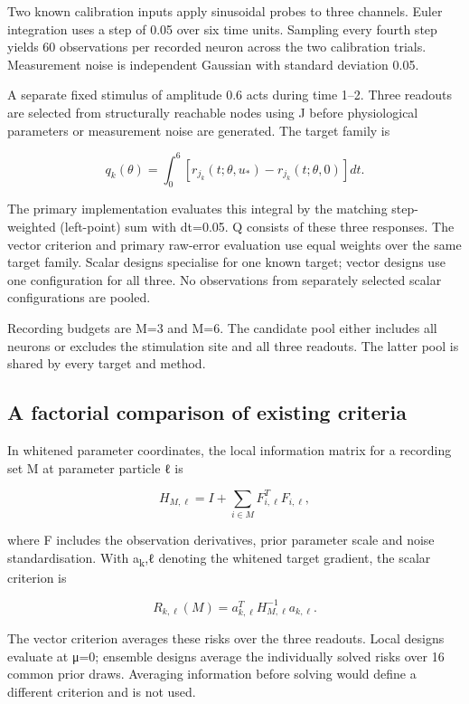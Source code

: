 Two known calibration inputs apply sinusoidal probes to three channels. Euler integration uses a step of 0.05 over six time units. Sampling every fourth step yields 60 observations per recorded neuron across the two calibration trials. Measurement noise is independent Gaussian with standard deviation 0.05.

A separate fixed stimulus of amplitude 0.6 acts during time 1--2. Three readouts are selected from structurally reachable nodes using J before physiological parameters or measurement noise are generated. The target family is

\begin{equation}
q_k(\theta)=\int_0^6[r_{j_k}(t;\theta,u_*)-r_{j_k}(t;\theta,0)]dt.
\end{equation}

The primary implementation evaluates this integral by the matching step-weighted (left-point) sum with dt=0.05. Q consists of these three responses. The vector criterion and primary raw-error evaluation use equal weights over the same target family. Scalar designs specialise for one known target; vector designs use one configuration for all three. No observations from separately selected scalar configurations are pooled.

Recording budgets are M=3 and M=6. The candidate pool either includes all neurons or excludes the stimulation site and all three readouts. The latter pool is shared by every target and method.

\subsection{A factorial comparison of existing criteria}

In whitened parameter coordinates, the local information matrix for a recording set M at parameter particle ℓ is

\begin{equation}
H_{M,\ell}=I+\sum_{i\in M} F_{i,\ell}^{T}F_{i,\ell},
\end{equation}

where F includes the observation derivatives, prior parameter scale and noise standardisation. With a\textsubscript{k},ℓ denoting the whitened target gradient, the scalar criterion is

\begin{equation}
R_{k,\ell}(M)=a_{k,\ell}^{T}H_{M,\ell}^{-1}a_{k,\ell}.
\end{equation}

The vector criterion averages these risks over the three readouts. Local designs evaluate at μ=0; ensemble designs average the individually solved risks over 16 common prior draws. Averaging information before solving would define a different criterion and is not used.

